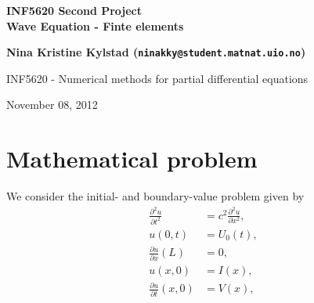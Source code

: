 \documentclass[twoside]{article}
\newcommand{\dutt}{\frac{\partial^2 u}{\partial t^2}}
\newcommand{\duxx}{\frac{\partial^2 u}{\partial x^2}}
\newcommand{\dut}{\frac{\partial u}{\partial t}}
\newcommand{\dux}{\frac{\partial u}{\partial x}}
\begin{document}






\begin{center}
{\LARGE\bf INF5620 Second Project}\\
{\LARGE\bf Wave Equation - Finte elements}
\end{center}





\begin{center}
{\bf Nina Kristine Kylstad (\texttt{ninakky@student.matnat.uio.no})} \\ [0mm]
\end{center}

\vspace{0.5cm}
\begin{center}
\centerline{INF5620 - Numerical methods for partial differential equations}
\end{center}





\begin{center}
November 08, 2012
\end{center}

\vspace{1cm}


\begin{abstract}
This report investigates the one dimensional wave equation,
and using finite element methods for solving a wave equation.
\end{abstract}

\tableofcontents





\section{Mathematical problem}

\label{math:problem}

 

We consider the initial- and boundary-value problem given by 
\begin{align}
\dutt &= c^2 \duxx,	\label{1D:wave:eq}\\
u(0,t) &= U_0(t),  	\label{bc:x0}\\
\dux(L) &= 0, 		\label{bc:dux:xL}\\
u(x,0) &= I(x),		\label{ic:t0}\\
\dut(x,0) &= V(x),	\label{ic:dut:t0}
\end{align}
\end{document}
